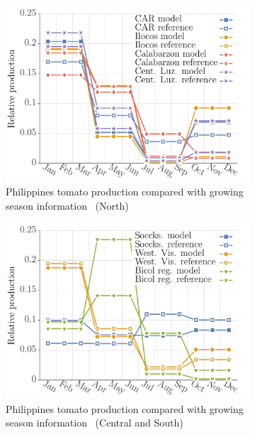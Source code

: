 \documentclass[10pt]{article}
\theoremstyle{definition}
\begin{document}
\begin{figure}[!ht]
\begin{subfigure}[b]{.32\textwidth}
\includegraphics[width=\textwidth]{../production/results/prod_tomato_PHL_north.pdf}
\caption{Philippines tomato production compared with growing season
    information~\cite{psa2017} (North)}
\end{subfigure}
\begin{subfigure}[b]{.32\textwidth}
\includegraphics[width=\textwidth]{../production/results/prod_tomato_PHL_central.pdf}
\caption{Philippines tomato production compared with growing season
    information~\cite{psa2017} (Central and South)}
\end{subfigure}
\begin{subfigure}[b]{.32\textwidth}

\end{subfigure}
\end{figure}
\end{document}
